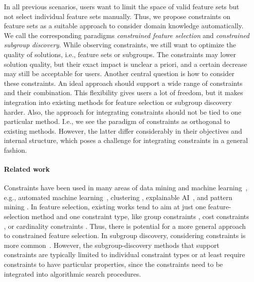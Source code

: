 In all previous scenarios, users want to limit the space of valid feature sets but not select individual feature sets manually.
Thus, we propose constraints on feature sets as a suitable approach to consider domain knowledge automatically.
We call the corresponding paradigms \emph{constrained feature selection} and \emph{constrained subgroup discovery}.
While observing constraints, we still want to optimize the quality of solutions, i.e., feature sets or subgroups.
The constraints may lower solution quality, but their exact impact is unclear a priori, and a certain decrease may still be acceptable for users.
Another central question is how to consider these constraints.
An ideal approach should support a wide range of constraints and their combination.
This flexibility gives users a lot of freedom, but it makes integration into existing methods for feature selection or subgroup discovery harder.
Also, the approach for integrating constraints should not be tied to one particular method.
I.e., we see the paradigm of constraints as orthogonal to existing methods.
However, the latter differ considerably in their objectives and internal structure, which poses a challenge for integrating constraints in a general fashion.

\paragraph{Related work}

Constraints have been used in many areas of data mining and machine learning~\cite{grossi2017survey}, e.g., automated machine learning~\cite{neutatz2023automl}, clustering \cite{dao2013declarative, dao2024review}, explainable AI~\cite{deutch2019constraints, gorji2022sufficient,  mothilal2020explaining, shrotri2022constraint}, and pattern mining \cite{ng1998exploratory, silva2016constrained}.
In feature selection, existing works tend to aim at just one feature-selection method and one constraint type, like group constraints \cite{friedman2010note, jacob2009group, simon2013sparse, yuan2006model, zhao2006grouped}, cost constraints \cite{jagdhuber2020cost, momeni2021cafs, paclik2002feature, plasberg2009feature, zhang2016learning}, or cardinality constraints \cite{khushaba2011feature, lee2018effective, serpico2001new, yang2015budget}.
Thus, there is potential for a more general approach to constrained feature selection.
In subgroup discovery, considering constraints is more common~\cite{atzmueller2015subgroup, meeng2021real}.
However, the subgroup-discovery methods that support constraints are typically limited to individual constraint types or at least require constraints to have particular properties, since the constraints need to be integrated into algorithmic search procedures.

